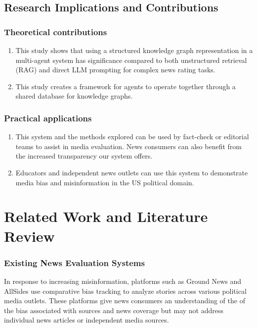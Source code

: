 \documentclass[11pt]{article}
\begin{document}
\subsection{Research Implications and Contributions}
\subsubsection{Theoretical contributions}
\begin{enumerate}
    \item This study shows that using a structured knowledge graph representation in a multi-agent system has significance compared to both unstructured retrieval (RAG) and direct LLM prompting for complex news rating tasks.

    \item This study creates a framework for agents to operate together through a shared database for knowledge graphs.


\end{enumerate}

\subsubsection{Practical applications}
\begin{enumerate}
    \item This system and the methods explored can be used by fact-check or editorial teams to assist in media evaluation. News consumers can also benefit from the increased transparency our system offers. 
    \item Educators and independent news outlets can use this system to demonstrate media bias and misinformation in the US political domain. 


\end{enumerate}

\section{Related Work and Literature Review}
\subsubsection{Existing News Evaluation Systems}
In response to increasing misinformation, platforms such as Ground News\cite{r18} and AllSides use comparative bias tracking to analyze stories across various political media outlets. These platforms give news consumers an understanding of the of the bias associated with sources and news coverage but may not address individual news articles or independent media sources. 
\end{document}

